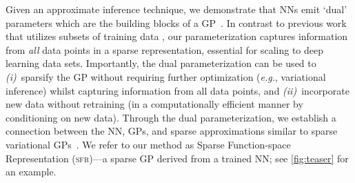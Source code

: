 \documentclass{article}
\makeatletter
\newcommand{\eg}{\textit{e.g.\@}\xspace}
\newcommand{\ie}{\textit{i.e.\@}\xspace}
\newcommand{\our}{\textsc{sfr}\xspace}
\makeatother
\begin{document}
Given an approximate inference technique, we demonstrate that NNs emit `dual' parameters which are the building blocks of a GP~\citep{csato2002sparse, adam2021dual, chang2023memory}.
In contrast to previous work that utilizes subsets of training data \citep{immer2021scalable}, our parameterization captures
information from {\em all} data points in a sparse representation, essential for scaling to deep learning data sets.
Importantly, the dual parameterization can be used to {\em (i)}~sparsify the GP without requiring further optimization
(\eg, variational inference) whilst capturing information from all data points, and {\em (ii)}~incorporate new data without retraining (in a computationally efficient manner
by conditioning on new data).
Through the dual parameterization, we establish a connection between the NN, GPs, and sparse approximations similar to sparse variational GPs~\citep{titsias2009variational}. We refer to our method as Sparse Function-space Representation (\our)---a sparse GP derived from a trained NN; see \cref{fig:teaser} for an example. %
\end{document}
